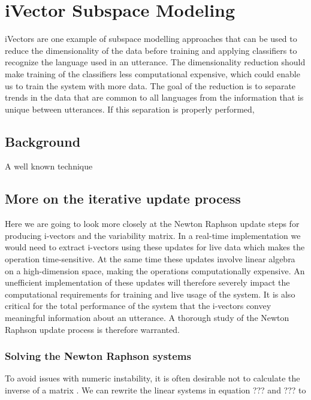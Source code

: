 \chapter{iVector Subspace Modeling}

iVectors are one example of subspace modelling approaches that can be used to reduce the dimensionality of the data before training and applying classifiers to recognize the language used in an utterance. The dimensionality reduction should make training of the classifiers less computational expensive, which could enable us to train the system with more data. The goal of the reduction is to separate trends in the data that are common to all languages from the information that is unique between utterances. If this separation is properly performed, 

\section{Background}

A well known technique



\section{More on the iterative update process}

Here we are going to look more closely at the Newton Raphson update steps for producing i-vectors and the variability matrix. In a real-time implementation we would need to extract i-vectors using these updates for live data which makes the operation time-sensitive. At the same time these updates involve linear algebra on a high-dimension space, making the operations computationally expensive. An unefficient implementation of these updates will therefore severely impact the computational requirements for training and live usage of the system. It is also critical for the total performance of the system that the i-vectors convey meaningful information about an utterance. A thorough study of the Newton Raphson update process is therefore warranted. 

\subsection{Solving the Newton Raphson systems}

To avoid issues with numeric instability, it is often desirable not to calculate the inverse of a matrix \cite[p. 743]{cormen}. We can rewrite the linear systems in equation ??? and ??? to

